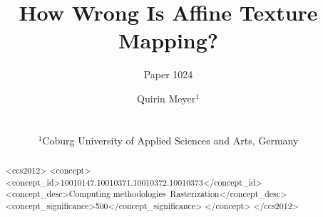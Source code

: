 \documentclass{download/egPublStyle-cgf/egpubl}
\author[Paper 1024]{\parbox{\textwidth}{\centering Paper 1024}}
\author[Q. Meyer]
    {\parbox{\textwidth}{\centering
            Quirin Meyer$^1$\orcid{0000-0001-7073-442X}
            }%
            \\%
            {%
                \parbox{\textwidth}
                {
                    \centering $^1$Coburg University of Applied Sciences and Arts, Germany
                }%
            }%
    }
\title{How Wrong Is Affine Texture Mapping?}
\begin{document}
\teaser
{
    
}
\maketitle
\begin{abstract}

\begin{CCSXML}
<ccs2012>
<concept>
<concept_id>10010147.10010371.10010372.10010373</concept_id>
<concept_desc>Computing methodologies~Rasterization</concept_desc>
<concept_significance>500</concept_significance>
</concept>
</ccs2012>
\end{CCSXML}

\printccsdesc 
\end{abstract}

 



\end{document}
